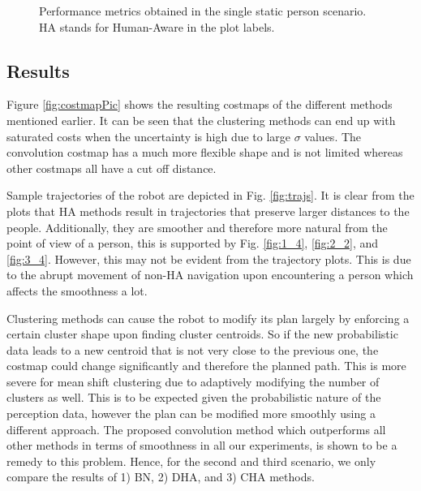 \begin{figure}
\caption{Performance metrics obtained in the single static person scenario. HA stands for Human-Aware in the plot labels.
}
\label{fig:boxplots_singlePerson}
\end{figure}

\subsection{Results}
\label{sec:results}
Figure \ref{fig:costmapPic} shows the resulting costmaps of the different methods mentioned earlier. It can be seen that the clustering methods can end up with saturated costs when the uncertainty is high due to large $\sigma$ values. The convolution costmap has a much more flexible shape and is not limited whereas other costmaps all have a cut off distance.

Sample trajectories of the robot are depicted in Fig. \ref{fig:trajs}. It is clear from the plots that HA methods result in trajectories that preserve larger distances to the people. Additionally, they are smoother and therefore more natural from the point of view of a person, this is supported by Fig. \ref{fig:1_4}, \ref{fig:2_2}, and \ref{fig:3_4}. However, this may not be evident from the trajectory plots. This is due to the abrupt movement of non-HA navigation upon encountering a person which affects the smoothness a lot. 

Clustering methods can cause the robot to modify its plan largely by enforcing a certain cluster shape upon finding cluster centroids. So if the new probabilistic data leads to a new centroid that is not very close to the previous one, the costmap could change significantly and therefore the planned path. This is more severe for mean shift clustering due to adaptively modifying the number of clusters as well. This is to be expected given the probabilistic nature of the perception data, however the plan can be modified more smoothly using a different approach. The proposed convolution method which outperforms all other methods in terms of smoothness in all our experiments, is shown to be a remedy to this problem. Hence, for the second and third scenario, we only compare the results of 1) BN, 2) DHA, and 3) CHA methods.  

